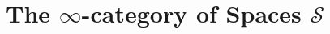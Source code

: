 \documentclass[a4paper,10pt]{scrartcl}
\theoremstyle{plain}
\newcommand{\spaces}{\mathcal{S}}
\newcommand{\inftycat}{}
\def\inftycat/{$\infty$-category}
\begin{document}
    \section{The \inftycat/ of Spaces $\spaces$}
    
\end{document}
